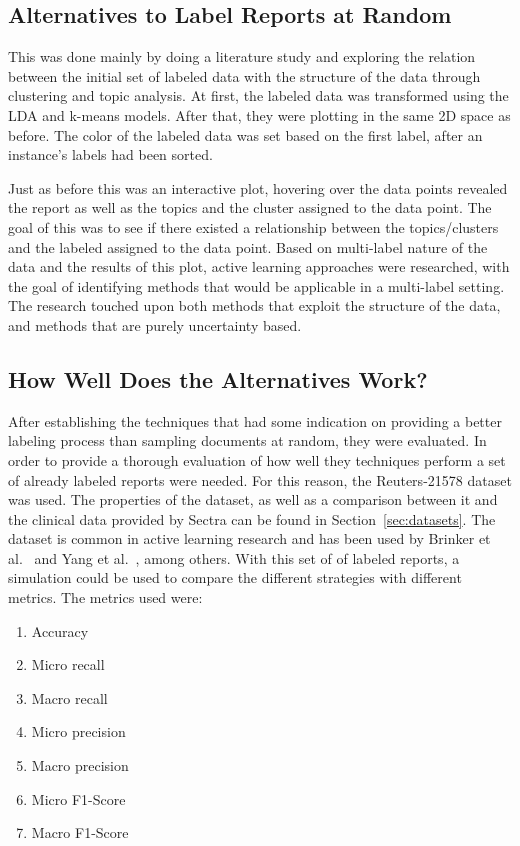 \subsection{Alternatives to Label Reports at Random}\label{sec:exp1-method}

This was done mainly by doing a literature study and exploring the relation between the initial set of labeled data with the structure of the data through clustering and topic analysis.
At first, the labeled data was transformed using the LDA and k-means models.
After that, they were plotting in the same 2D space as before.
The color of the labeled data was set based on the first label, after an instance's labels had been sorted.

Just as before this was an interactive plot, hovering over the data points revealed the report as well as the topics and the cluster assigned to the data point.
The goal of this was to see if there existed a relationship between the topics/clusters and the labeled assigned to the data point.
Based on multi-label nature of the data and the results of this plot, active learning approaches were researched, with the goal of identifying methods that would be applicable in a multi-label setting.
The research touched upon both methods that exploit the structure of the data, and methods that are purely uncertainty based.

\subsection{How Well Does the Alternatives Work?}

After establishing the techniques that had some indication on providing a better labeling process than sampling documents at random, they were evaluated.
In order to provide a thorough evaluation of how well they techniques perform a set of already labeled reports were needed.
For this reason, the Reuters-21578 dataset was used.
The properties of the dataset, as well as a comparison between it and the clinical data provided by Sectra can be found in Section~\ref{sec:datasets}.
The dataset is common in active learning research and has been used by Brinker et al\@.~\cite{brinker2006active} and Yang et al\@.~\cite{yang2009effective}, among others.
With this set of of labeled reports, a simulation could be used to compare the different strategies with different metrics.
The metrics used were:
\begin{enumerate}
    \item Accuracy
    \item Micro recall
    \item Macro recall
    \item Micro precision
    \item Macro precision
    \item Micro F1-Score
    \item Macro F1-Score
\end{enumerate}


